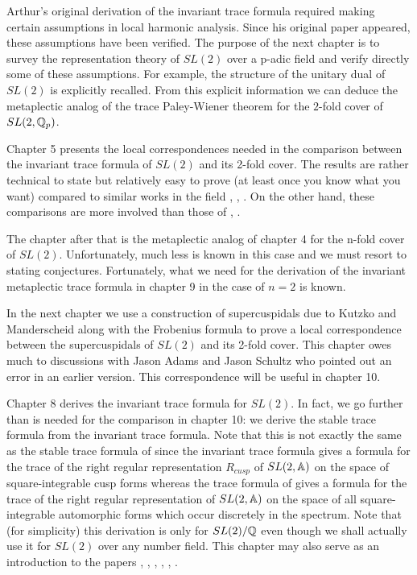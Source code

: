 \documentclass[12pt,thmsa]{book}
\begin{document}
Arthur's original derivation of the invariant trace formula required making
certain assumptions in local harmonic analysis. Since his original paper 
\cite{A6} appeared, these assumptions have been verified. The purpose of the
next chapter is to survey the representation theory of $SL(2)$ over a p-adic
field and verify directly some of these assumptions. For example, the
structure of the unitary dual of $SL(2)$ is explicitly recalled.
From this explicit information we can deduce the metaplectic analog
of the trace Paley-Wiener theorem \cite{BDK} for
the $2$-fold cover of $SL(2,{\Bbb{Q}}_p)$.

Chapter 5 presents the local correspondences needed in the comparison
between the invariant trace formula of $SL(2)$ and its 2-fold cover. The
results are rather technical to state but relatively easy to prove (at least
once you know what you want) compared to similar works in the field \cite{L4}%
, \cite{Fl}, \cite{R}. On the other hand, these comparisons are more
involved than those of \cite{JL}, \cite{LL}.

The chapter after that is the metaplectic analog of chapter 4 for the n-fold
cover of $SL(2)$. Unfortunately, much less is known in this case and we must
resort to stating conjectures. Fortunately, what we need for the derivation
of the invariant metaplectic trace formula in chapter 9 in the case of $n=2$
is known.

In the next chapter we use a construction of supercuspidals due to Kutzko
and Manderscheid along with the Frobenius formula to prove a local
correspondence between the supercuspidals of $SL(2)$ and its 2-fold cover.
This chapter owes much to discussions with Jason Adams and Jason
Schultz who pointed out an error in an earlier version.
This correspondence will be useful in chapter 10.

Chapter 8 derives the invariant trace formula for $SL(2)$. In fact, we go
further than is needed for the comparison in chapter 10: we derive the
stable trace formula from the invariant trace formula. Note that this is not
exactly the same as the stable trace formula of \cite{LL} since the
invariant trace formula gives a formula for the trace of the right regular
representation $R_{cusp}$ of $SL(2,\Bbb{A})$ on the space of
square-integrable cusp forms whereas the trace formula of \cite{LL} gives a
formula for the trace of the right regular representation of $SL(2,\Bbb{A})$
on the space of all square-integrable automorphic forms which occur
discretely in the spectrum. Note that (for simplicity) this derivation is
only for $SL(2)/{\Bbb{Q}}$ even though we shall actually use it for $SL(2)$
over any number field. This chapter may also serve as an introduction to the
papers \cite{LL}, \cite{A2}, \cite{A3}, \cite{A6}, \cite{A9}, \cite{A10}.
\end{document}
